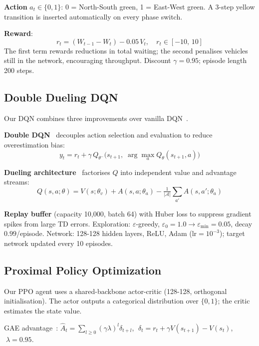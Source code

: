 \documentclass[10pt]{article}
\begin{document}
\textbf{Action} $a_t \in \{0, 1\}$: 0 = North-South green, 1 = East-West green.
A 3-step yellow transition is inserted automatically on every phase switch.

\textbf{Reward}:
\begin{equation}
r_t = (W_{t-1} - W_t) - 0.05\,V_t, \quad r_t \in [-10,\,10]
\label{eq:reward}
\end{equation}
The first term rewards reductions in total waiting; the second penalises
vehicles still in the network, encouraging throughput.
Discount $\gamma = 0.95$; episode length 200 steps.

\subsection{Double Dueling DQN}

Our DQN combines three improvements over vanilla DQN~\citep{mnih2015human}.

\textbf{Double DQN}~\citep{van2016deep} decouples action selection and
evaluation to reduce overestimation bias:
\begin{equation}
y_t = r_t + \gamma\,Q_{\theta^-}\!\bigl(s_{t+1},\;
      \arg\max_a Q_\theta(s_{t+1}, a)\bigr)
\end{equation}

\textbf{Dueling architecture}~\citep{wang2016dueling} factorises $Q$ into
independent value and advantage streams:
\begin{equation}
Q(s,a;\theta) = V(s;\theta_v) +
A(s,a;\theta_a) - \tfrac{1}{|\mathcal{A}|}\textstyle\sum_{a'}A(s,a';\theta_a)
\end{equation}

\textbf{Replay buffer} (capacity 10,000, batch 64) with Huber loss to suppress
gradient spikes from large TD errors.  Exploration: $\varepsilon$-greedy,
$\varepsilon_0{=}1.0 \to \varepsilon_{\min}{=}0.05$, decay $0.99$/episode.
Network: 128-128 hidden layers, ReLU, Adam ($\text{lr}=10^{-3}$); target
network updated every 10 episodes.

\subsection{Proximal Policy Optimization}

Our PPO agent uses a shared-backbone actor-critic (128-128, orthogonal
initialisation).  The actor outputs a categorical distribution over $\{0,1\}$;
the critic estimates the state value.

GAE advantage~\citep{schulman2015high}:
$\hat{A}_t = \sum_{l \ge 0}(\gamma\lambda)^l\delta_{t+l}$,
$\;\delta_t = r_t + \gamma V(s_{t+1}) - V(s_t)$, $\;\lambda{=}0.95$.
\end{document}
